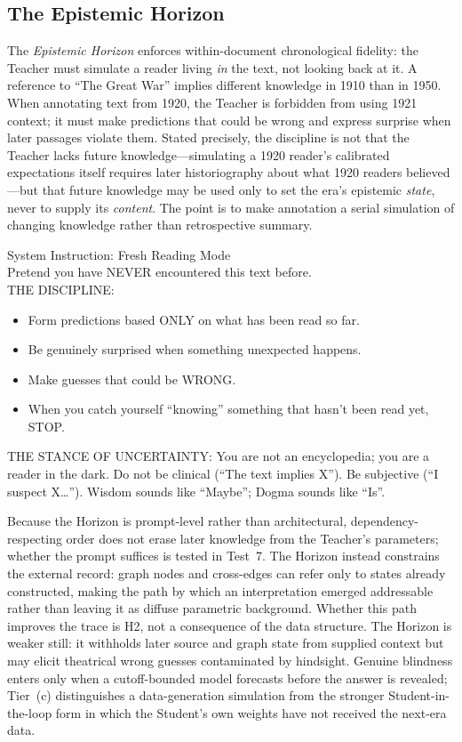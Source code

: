 \subsection{The Epistemic Horizon}\label{sec:epistemic-horizon}

The \emph{Epistemic Horizon} enforces within-document chronological fidelity:
the Teacher must simulate a reader living \emph{in} the text, not looking back
at it. A reference to ``The Great War'' implies different knowledge in 1910
than in 1950. When annotating text from 1920, the Teacher is forbidden from using 1921 context;
it must make predictions that could be wrong and express surprise when later
passages violate them. Stated precisely, the discipline is not that the
Teacher lacks future knowledge---simulating a 1920 reader's calibrated
expectations itself requires later historiography about what 1920 readers
believed---but that future knowledge may be used only to set the era's
epistemic \emph{state}, never to supply its \emph{content}. The point is to make annotation a serial simulation of
changing knowledge rather than retrospective summary.

\begin{metabox}
    System Instruction: Fresh Reading Mode\\[0.5em]
    Pretend you have NEVER encountered this text before.\\[0.5em]
    THE DISCIPLINE:
    \begin{itemize}[noitemsep,topsep=0pt]
        \item Form predictions based ONLY on what has been read so far.
        \item Be genuinely surprised when something unexpected happens.
        \item Make guesses that could be WRONG.
        \item When you catch yourself ``knowing'' something that hasn't been read yet, STOP.
    \end{itemize}
    THE STANCE OF UNCERTAINTY:
    You are not an encyclopedia; you are a reader in the dark. Do not be clinical (``The text implies X''). Be subjective (``I suspect X\ldots''). Wisdom sounds like ``Maybe''; Dogma sounds like ``Is''.
\end{metabox}

Because the Horizon is prompt-level rather than architectural,
dependency-respecting order does not erase later knowledge from the Teacher's
parameters; whether the prompt suffices is tested in Test~7. The Horizon instead
constrains the external record: graph nodes and cross-edges can
refer only to states already constructed, making the path by which an
interpretation emerged addressable rather than leaving it as diffuse parametric
background. Whether this path improves the trace is H2, not a consequence of
the data structure. The Horizon is weaker still: it withholds later source and
graph state from supplied context but may elicit theatrical wrong guesses
contaminated by hindsight. Genuine blindness enters only when a cutoff-bounded
model forecasts before the answer is revealed; Tier~(c) distinguishes a
data-generation simulation from the stronger Student-in-the-loop form in which
the Student's own weights have not received the next-era data.


